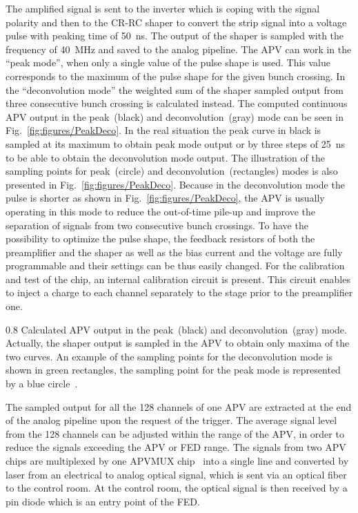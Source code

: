 The amplified signal is sent to the inverter which is coping with the signal polarity and then to the CR-RC shaper to convert the strip signal into a voltage pulse with peaking time of 50~ns. The output of the shaper is sampled with the frequency of 40~MHz and saved to the analog pipeline. The APV can work in the ``peak mode'', when only a single value of the pulse shape is used. This value corresponds to the maximum of the pulse shape for the given bunch crossing. In the ``deconvolution mode'' the weighted sum of the shaper sampled output from three consecutive bunch crossing is calculated instead. The computed continuous APV output in the peak~(black) and deconvolution~(gray) mode can be seen in Fig.~\ref{fig:figures/PeakDeco}. In the real situation the peak curve in black is sampled at its maximum to obtain peak mode output or by three steps of 25~ns to be able to obtain the deconvolution mode output. The illustration of the sampling points for peak~(circle) and deconvolution~(rectangles) modes is also presented in Fig.~\ref{fig:figures/PeakDeco}. Because in the deconvolution mode the pulse is shorter as shown in Fig.~\ref{fig:figures/PeakDeco}, the APV is usually operating in this mode to reduce the out-of-time pile-up and improve the separation of signals from two consecutive bunch crossings. To have the possibility to optimize the pulse shape, the feedback resistors of both the preamplifier and the shaper as well as the bias current and the voltage are fully programmable and their settings can be thus easily changed. For the calibration and test of the chip, an internal calibration circuit is present. This circuit enables to inject a charge to each channel separately to the stage prior to the preamplifier one.


                 {0.8}       %
                 {Calculated APV output in the peak~(black) and deconvolution~(gray) mode. Actually, the shaper output is sampled in the APV to obtain only maxima of the two curves. An example of the sampling points for the deconvolution mode is shown in green rectangles, the sampling point for the peak mode is represented by a blue circle~\cite{Friedl:2001kra}.} %


The sampled output for all the 128 channels of one APV are extracted at the end of the analog pipeline upon the request of the trigger. The average signal level from the 128 channels can be adjusted within the range of the APV, in order to reduce the signals exceeding the APV or FED range. The signals from two APV chips are multiplexed by one APVMUX chip~\cite{Ball:2007zza} into a single line and converted by laser from an electrical to analog optical signal, which is sent via an optical fiber to the control room. At the control room, the optical signal is then received by a pin diode which is an entry point of the FED.

